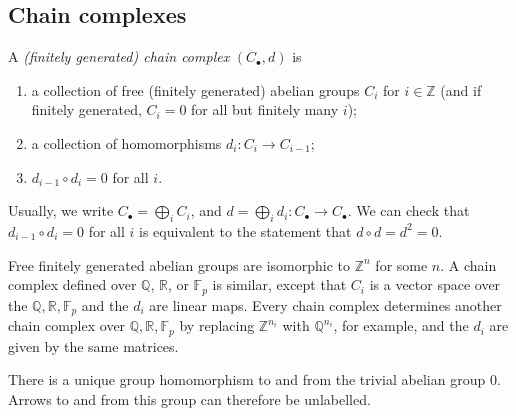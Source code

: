 \subsection{Chain complexes}
\begin{definition}
	A \emph{(finitely generated) chain complex} \( (C_\bullet, d) \) is
	\begin{enumerate}
		\item a collection of free (finitely generated) abelian groups \( C_i \) for \( i \in \mathbb Z \) (and if finitely generated, \( C_i = 0 \) for all but finitely many \( i \));
		\item a collection of homomorphisms \( d_i \colon C_i \to C_{i-1} \);
		\item \( d_{i-1} \circ d_i = 0 \) for all \( i \).
	\end{enumerate}
	\begin{center}
	\end{center}
\end{definition}
Usually, we write \( C_\bullet = \bigoplus_i C_i \), and \( d = \bigoplus_i d_i \colon C_\bullet \to C_\bullet \).
We can check that \( d_{i-1} \circ d_i = 0 \) for all \( i \) is equivalent to the statement that \( d \circ d = d^2 = 0 \).
\begin{remark}
	Free finitely generated abelian groups are isomorphic to \( \mathbb Z^n \) for some \( n \).
	A chain complex defined over \( \mathbb Q \), \( \mathbb R \), or \( \mathbb F_p \) is similar, except that \( C_i \) is a vector space over the \( \mathbb Q, \mathbb R, \mathbb F_p \) and the \( d_i \) are linear maps.
	Every chain complex determines another chain complex over \( \mathbb Q, \mathbb R, \mathbb F_p \) by replacing \( \mathbb Z^{n_i} \) with \( \mathbb Q^{n_i} \), for example, and the \( d_i \) are given by the same matrices.
\end{remark}
\begin{remark}
	There is a unique group homomorphism to and from the trivial abelian group \( 0 \).
	Arrows to and from this group can therefore be unlabelled.
\end{remark}
